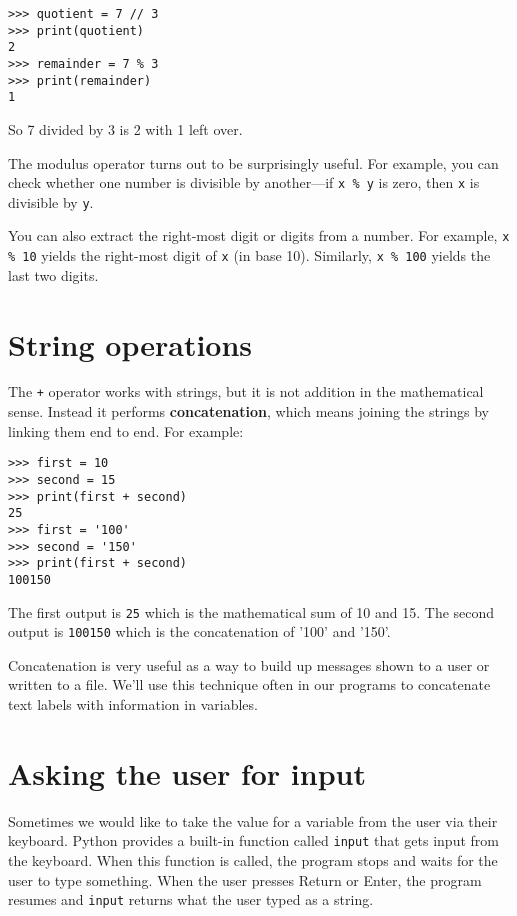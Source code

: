 \beforeverb
\begin{verbatim}
>>> quotient = 7 // 3
>>> print(quotient)
2
>>> remainder = 7 % 3
>>> print(remainder)
1
\end{verbatim}
\afterverb
%
So 7 divided by 3 is 2 with 1 left over.

The modulus operator turns out to be surprisingly useful.  For
example, you can check whether one number is divisible by another---if
{\tt x \% y} is zero, then {\tt x} is divisible by {\tt y}.


You can also extract the right-most digit
or digits from a number.  For example, {\tt x \% 10} yields the
right-most digit of {\tt x} (in base 10).  Similarly, {\tt x \% 100}
yields the last two digits.



\section{String operations}

The {\tt +} operator works with strings, but it
is not addition in the mathematical sense. Instead it performs
{\bf concatenation}, which means joining the strings by
linking them end to end.  For example:


\beforeverb
\begin{verbatim}
>>> first = 10
>>> second = 15
>>> print(first + second)
25
>>> first = '100'
>>> second = '150'
>>> print(first + second)
100150
\end{verbatim}
\afterverb
%
The first output is {\tt 25} which is the mathematical sum of 10 and 15. The second output is {\tt 100150} which is the concatenation of '100' and '150'.

Concatenation is very useful as a way to build up messages shown to a user or written to a file. We'll use this technique often in our programs to concatenate text labels with information in variables.


\section{Asking the user for input}

Sometimes we would like to take the value for a variable from the user
via their keyboard.
Python provides a built-in function called \verb"input" that gets
input from the keyboard.  When this function is called, the program stops and
waits for the user to type something.  When the user presses {\sf
  Return} or {\sf Enter}, the program resumes and \verb"input"
returns what the user typed as a string.

